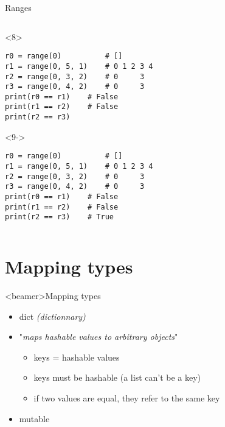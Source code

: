 \begin{frame}[fragile]{Ranges}
\begin{center}
\begin{columns}[onlytextwidth]
\begin{column}{\textwidth}
      \begin{onlyenv}<8>
        \begin{lstlisting}[style=python,morekeywords={for, in, range, list}]
r0 = range(0)          # []
r1 = range(0, 5, 1)    # 0 1 2 3 4
r2 = range(0, 3, 2)    # 0     3
r3 = range(0, 4, 2)    # 0     3
print(r0 == r1)    # False
print(r1 == r2)    # False
print(r2 == r3) \end{lstlisting}
      \end{onlyenv}

      \begin{onlyenv}<9->
        \begin{lstlisting}[style=python,morekeywords={for, in, range, list}]
r0 = range(0)          # []
r1 = range(0, 5, 1)    # 0 1 2 3 4
r2 = range(0, 3, 2)    # 0     3
r3 = range(0, 4, 2)    # 0     3
print(r0 == r1)    # False
print(r1 == r2)    # False
print(r2 == r3)    # True \end{lstlisting}
      \end{onlyenv}

    \end{column}
  \end{columns}

  \end{center}

\end{frame}


\section{Mapping types}

\begin{frame}<beamer>{Mapping types}

  \begin{itemize}
    \item<1-> dict \textit{(dictionnary)}
  \end{itemize}

  \begin{itemize}
    \item<2-> "\textit{maps hashable values to arbitrary objects}"
    \begin{itemize}
      \item<3-> keys = hashable values
      \item<4-> keys must be hashable (a list can't be a key)
      \item<5-> if two values are equal, they refer to the same key
    \end{itemize}
    \item<6-> mutable
  \end{itemize}


\end{frame}

